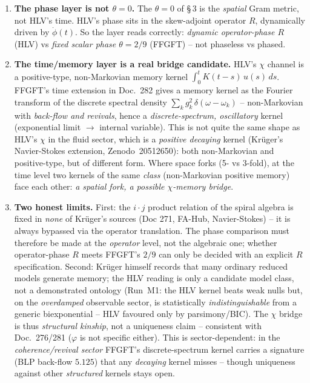 \begin{enumerate}
\item \textbf{The phase layer is not $\theta=0$.} The $\theta=0$ of §\,3 is the
\emph{spatial} Gram metric, not HLV's time. HLV's phase sits in the skew-adjoint
operator $R$, dynamically driven by $\dot\phi(t)$. So the layer reads correctly:
\emph{dynamic operator-phase $R$} (HLV) vs \emph{fixed scalar phase $\theta=2/9$}
(FFGFT) -- not phaseless vs phased.

\item \textbf{The time/memory layer is a real bridge candidate.} HLV's $\chi$
channel is a positive-type, non-Markovian memory kernel $\int_0^t K(t-s)\,u(s)\,ds$.
FFGFT's time extension in Doc.~282 gives a memory kernel as the Fourier transform of
the discrete spectral density $\sum_k g_k^2\,\delta(\omega-\omega_k)$ -- non-Markovian
with \emph{back-flow and revivals}, hence a \emph{discrete-spectrum, oscillatory}
kernel (exponential limit $\to$ internal variable). This is not quite the same shape
as HLV's $\chi$ in the fluid sector, which is a \emph{positive decaying} kernel
(Krüger's Navier-Stokes extension, Zenodo~20512650): both non-Markovian and
positive-type, but of different form. Where space forks (5- vs 3-fold), at the time
level two kernels of the same \emph{class} (non-Markovian positive memory) face each
other: \emph{a spatial fork, a possible $\chi$-memory bridge}.

\item \textbf{Two honest limits.} First: the $i\!\cdot\!j$ product relation of the
spiral algebra is fixed in \emph{none} of Krüger's sources (Doc 271, FA-Hub,
Navier-Stokes) -- it is always bypassed via the operator translation. The phase
comparison must therefore be made at the \emph{operator} level, not the algebraic
one; whether operator-phase $R$ meets FFGFT's $2/9$ can only be decided with an
explicit $R$ specification. Second: Krüger himself records that many ordinary
reduced models generate memory; the HLV reading is only a candidate model class, not
a demonstrated ontology (Run~M1: the HLV kernel beats weak nulls but, on the
\emph{overdamped} observable sector, is statistically \emph{indistinguishable} from a
generic biexponential -- HLV favoured only by parsimony/BIC). The $\chi$ bridge is
thus \emph{structural kinship}, not a uniqueness claim -- consistent with
Doc.~276/281 ($\varphi$ is not specific either). This is sector-dependent: in the
\emph{coherence/revival sector} FFGFT's discrete-spectrum kernel carries a signature
(BLP back-flow $5.125$) that any \emph{decaying} kernel misses -- though uniqueness
against other \emph{structured} kernels stays open.
\end{enumerate}

